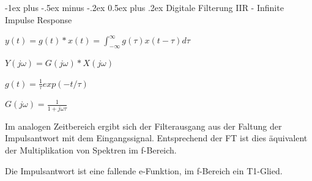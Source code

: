 \documentclass[a4paper]{article}
\makeatletter
\renewcommand{\section}{\@startsection{section}{1}{0mm}%
 {-1ex plus -.5ex minus -.2ex}%
 {0.5ex plus .2ex}%
 {\normalfont\large\bfseries}}
\makeatother
\begin{document}
\begin{multicols}{3}
  \section{Digitale Filterung}\label{digitale-filterung}
  IIR - Infinite Impulse Response
  \begin{itemize*}
    \item $y(t)=g(t)*x(t)=\int_{-\infty}^{\infty} g(\tau)x(t-\tau) d\tau$
    \item $Y(j\omega)=G(j\omega)* X(j\omega)$
    \item $g(t)=\frac{1}{\tau}exp(-t/\tau)$
    \item $G(j\omega)=\frac{1}{1+j\omega\tau}$
    \item Im analogen Zeitbereich ergibt sich der Filterausgang aus der Faltung der Impulsantwort mit dem Eingangssignal. Entsprechend der FT ist dies äquivalent der Multiplikation von Spektren im f-Bereich.
    \item Die Impulsantwort ist eine fallende e-Funktion, im f-Bereich ein T1-Glied.
  \end{itemize*}


\end{multicols}
\end{document}
